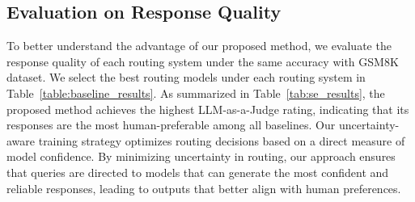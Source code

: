 \subsection{Evaluation on Response Quality}

To better understand the advantage of our proposed method, we evaluate the response quality of each routing system under the same accuracy with GSM8K dataset. We select the best routing models under each routing system in Table~\ref{table:baseline_results}. As summarized in Table~\ref{tab:se_results}, the proposed method achieves the highest LLM-as-a-Judge rating, indicating that its responses are the most human-preferable among all baselines. Our uncertainty-aware training strategy optimizes routing decisions based on a direct measure of model confidence. By minimizing uncertainty in routing, our approach ensures that queries are directed to models that can generate the most confident and reliable responses, leading to outputs that better align with human preferences.

